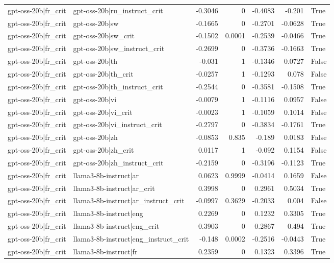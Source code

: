\begin{table}
\begin{tabular}{l l r r r r l}
gpt-oss-20b|fr_crit & gpt-oss-20b|ru_instruct_crit & -0.3046 & 0 & -0.4083 & -0.201 & True \\
gpt-oss-20b|fr_crit & gpt-oss-20b|sw & -0.1665 & 0 & -0.2701 & -0.0628 & True \\
gpt-oss-20b|fr_crit & gpt-oss-20b|sw_crit & -0.1502 & 0.0001 & -0.2539 & -0.0466 & True \\
gpt-oss-20b|fr_crit & gpt-oss-20b|sw_instruct_crit & -0.2699 & 0 & -0.3736 & -0.1663 & True \\
gpt-oss-20b|fr_crit & gpt-oss-20b|th & -0.031 & 1 & -0.1346 & 0.0727 & False \\
gpt-oss-20b|fr_crit & gpt-oss-20b|th_crit & -0.0257 & 1 & -0.1293 & 0.078 & False \\
gpt-oss-20b|fr_crit & gpt-oss-20b|th_instruct_crit & -0.2544 & 0 & -0.3581 & -0.1508 & True \\
gpt-oss-20b|fr_crit & gpt-oss-20b|vi & -0.0079 & 1 & -0.1116 & 0.0957 & False \\
gpt-oss-20b|fr_crit & gpt-oss-20b|vi_crit & -0.0023 & 1 & -0.1059 & 0.1014 & False \\
gpt-oss-20b|fr_crit & gpt-oss-20b|vi_instruct_crit & -0.2797 & 0 & -0.3834 & -0.1761 & True \\
gpt-oss-20b|fr_crit & gpt-oss-20b|zh & -0.0853 & 0.835 & -0.189 & 0.0183 & False \\
gpt-oss-20b|fr_crit & gpt-oss-20b|zh_crit & 0.0117 & 1 & -0.092 & 0.1154 & False \\
gpt-oss-20b|fr_crit & gpt-oss-20b|zh_instruct_crit & -0.2159 & 0 & -0.3196 & -0.1123 & True \\
gpt-oss-20b|fr_crit & llama3-8b-instruct|ar & 0.0623 & 0.9999 & -0.0414 & 0.1659 & False \\
gpt-oss-20b|fr_crit & llama3-8b-instruct|ar_crit & 0.3998 & 0 & 0.2961 & 0.5034 & True \\
gpt-oss-20b|fr_crit & llama3-8b-instruct|ar_instruct_crit & -0.0997 & 0.3629 & -0.2033 & 0.004 & False \\
gpt-oss-20b|fr_crit & llama3-8b-instruct|eng & 0.2269 & 0 & 0.1232 & 0.3305 & True \\
gpt-oss-20b|fr_crit & llama3-8b-instruct|eng_crit & 0.3903 & 0 & 0.2867 & 0.494 & True \\
gpt-oss-20b|fr_crit & llama3-8b-instruct|eng_instruct_crit & -0.148 & 0.0002 & -0.2516 & -0.0443 & True \\
gpt-oss-20b|fr_crit & llama3-8b-instruct|fr & 0.2359 & 0 & 0.1323 & 0.3396 & True \\

\end{tabular}
\end{table}
